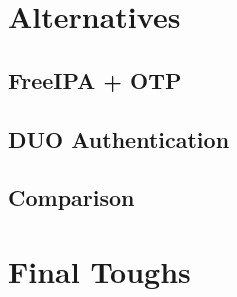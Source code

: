 \newpage
\section{Alternatives}

\subsection{FreeIPA + OTP}
\subsection{DUO Authentication}
\subsection{Comparison}

\newpage
\section{Final Toughs}



